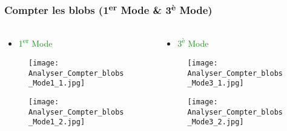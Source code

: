 \documentclass{beamer}
\begin{document}
\begin{frame}
\frametitle{Compter les blobs (1\textsuperscript{er} Mode \& 3\textsuperscript{è} Mode)}
\begin{columns}
\begin{column}{0.5\textwidth}
	\begin{itemize}
		\item \textcolor{forestgreen}{\Large{1\textsuperscript{er} Mode}}
	\end{itemize}
	\begin{figure}
	\begin{center}
	    \texttt{[image: Analyser\_Compter\_blobs\_Mode1\_1.jpg]}
	
	    \vspace{0.4cm}
	
	    \texttt{[image: Analyser\_Compter\_blobs\_Mode1\_2.jpg]}
	\end{center}
	\end{figure}

\end{column}

\begin{column}{0.5\textwidth}
	\begin{itemize}
		\item \textcolor{forestgreen}{\Large{3\textsuperscript{è} Mode}}
	\end{itemize}
	\begin{figure}
	\begin{center}
	    \texttt{[image: Analyser\_Compter\_blobs\_Mode3\_1.jpg]}
	
	    \vspace{0.4cm}
	
	    \texttt{[image: Analyser\_Compter\_blobs\_Mode3\_2.jpg]}
	\end{center}
	\end{figure}
\end{column}
\end{columns}
\end{frame}
\end{document}
